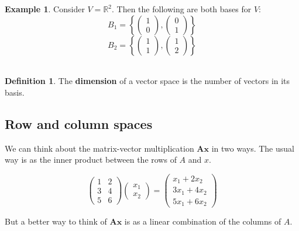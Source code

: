 \documentclass[
]{book}
\theoremstyle{definition}
\newtheorem{definition}{Definition}[chapter]
\theoremstyle{definition}
\newtheorem{example}{Example}[chapter]
\theoremstyle{definition}
\theoremstyle{definition}
\theoremstyle{remark}
\begin{document}
\begin{example}
\protect\hypertarget{exm:basisRp}{}{\label{exm:basisRp} }Consider \(V=\mathbb{R}^2\). Then the following are both bases for \(V\):
\[B_1=\left\{\left(\begin{array}{c}1\\0\end{array}\right), \left(\begin{array}{c}0\\1\end{array}\right)\right\}
\]
\[B_2=\left\{\left(\begin{array}{c}1\\1\end{array}\right), \left(\begin{array}{c}1\\2\end{array}\right)\right\}
\]\\
\end{example}

\begin{definition}
\protect\hypertarget{def:dimension}{}{\label{def:dimension} }The \textbf{dimension} of a vector space is the number of vectors in its basis.
\end{definition}

\hypertarget{colsspace}{%
\subsection{Row and column spaces}\label{colsspace}}

We can think about the matrix-vector multiplication \(\mathbf A\mathbf x\) in two ways. The usual way is as the inner product between the rows of \(A\) and \(x\).

\[ \left( \begin{array}{cc} 1 & 2\\ 3&4\\5&6\end{array}\right) \left(\begin{array}{c}x_1\\ x_2\end{array}\right) = \left(\begin{array}{c} x_1+2x_2\\3x_1+4x_2\\5x_1+6x_2\end{array}\right)\]

But a better way to think of \(\mathbf A\mathbf x\) is as a linear combination of the columns of \(A\).
\end{document}
